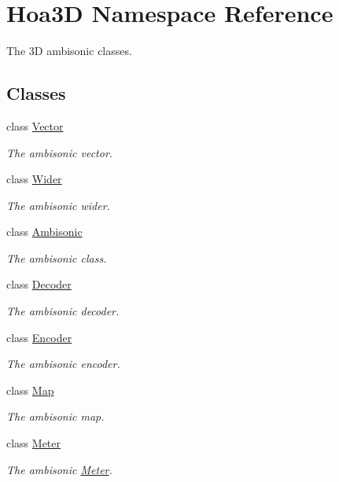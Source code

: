 \hypertarget{namespace_hoa3_d}{\section{Hoa3\-D Namespace Reference}
\label{namespace_hoa3_d}
}


The 3\-D ambisonic classes.  


\subsection*{Classes}
\begin{DoxyCompactItemize}
\item 
class \hyperlink{class_hoa3_d_1_1_vector}{Vector}
\begin{DoxyCompactList}\small\item\em The ambisonic vector. \end{DoxyCompactList}\item 
class \hyperlink{class_hoa3_d_1_1_wider}{Wider}
\begin{DoxyCompactList}\small\item\em The ambisonic wider. \end{DoxyCompactList}\item 
class \hyperlink{class_hoa3_d_1_1_ambisonic}{Ambisonic}
\begin{DoxyCompactList}\small\item\em The ambisonic class. \end{DoxyCompactList}\item 
class \hyperlink{class_hoa3_d_1_1_decoder}{Decoder}
\begin{DoxyCompactList}\small\item\em The ambisonic decoder. \end{DoxyCompactList}\item 
class \hyperlink{class_hoa3_d_1_1_encoder}{Encoder}
\begin{DoxyCompactList}\small\item\em The ambisonic encoder. \end{DoxyCompactList}\item 
class \hyperlink{class_hoa3_d_1_1_map}{Map}
\begin{DoxyCompactList}\small\item\em The ambisonic map. \end{DoxyCompactList}\item 
class \hyperlink{class_hoa3_d_1_1_meter}{Meter}
\begin{DoxyCompactList}\small\item\em The ambisonic \hyperlink{class_hoa3_d_1_1_meter}{Meter}. \end{DoxyCompactList}\item 

\end{DoxyCompactItemize}
